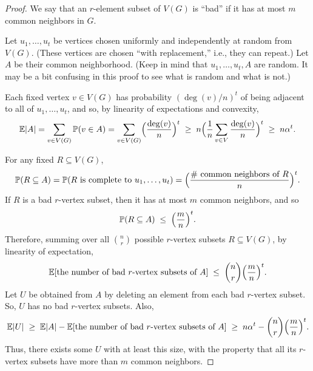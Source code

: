 \documentclass[11pt]{article}
\begin{document}
\begin{proof}
We say that an $r$-element subset of $V(G)$ is ``bad'' if it has at most $m$
common neighbors in $G$.

Let $u_1,\dots,u_t$ be vertices chosen uniformly and independently at random
from $V(G)$. (These vertices are chosen ``with replacement,'' i.e., they can
repeat.) Let $A$ be their common neighborhood. (Keep in mind that
$u_1,\dots,u_t,A$ are random. It may be a bit confusing in this proof to see
what is random and what is not.)

\begin{center}
\end{center}

Each fixed vertex $v\in V(G)$ has probability $(\deg(v)/n)^{t}$ of being
adjacent to all of $u_1,\dots,u_t$, and so, by linearity of expectations and
convexity,
\[
  \mathbb{E}|A|
  =\sum_{v\in V(G)}\mathbb{P}(v\in A)
  =\sum_{v\in V(G)}\Bigl(\frac{\deg(v)}{n}\Bigr)^{t}
  \;\ge\; n\Bigl(\frac{1}{n}\sum_{v\in V}\frac{\deg(v)}{n}\Bigr)^{t}
  \;\ge\; n\alpha^{t}.
\]

For any fixed $R\subseteq V(G)$,
\[
  \mathbb{P}(R\subseteq A)
  =\mathbb{P}(R\text{ is complete to }u_1,\dots,u_t)
  =\Bigl(\frac{\#\text{ common neighbors of }R}{n}\Bigr)^{t}.
\]
If $R$ is a bad $r$-vertex subset, then it has at most $m$ common neighbors,
and so
\[
  \mathbb{P}(R\subseteq A)\;\le\;\Bigl(\frac{m}{n}\Bigr)^{t}.
\]
Therefore, summing over all $\binom{n}{r}$ possible $r$-vertex subsets
$R\subseteq V(G)$, by linearity of expectation,
\[
  \mathbb{E}[\text{the number of bad }r\text{-vertex subsets of }A]
  \;\le\;\binom{n}{r}\Bigl(\frac{m}{n}\Bigr)^{t}.
\]
Let $U$ be obtained from $A$ by deleting an element from each bad $r$-vertex
subset. So, $U$ has no bad $r$-vertex subsets. Also,
\[
  \mathbb{E}|U|
  \;\ge\;\mathbb{E}|A|-\mathbb{E}[\text{the number of bad }r\text{-vertex
  subsets of }A]
  \;\ge\; n\alpha^{t}-\binom{n}{r}\Bigl(\frac{m}{n}\Bigr)^{t}.
\]
Thus, there exists some $U$ with at least this size, with the property that all
its $r$-vertex subsets have more than $m$ common neighbors.
\end{proof}
\end{document}
